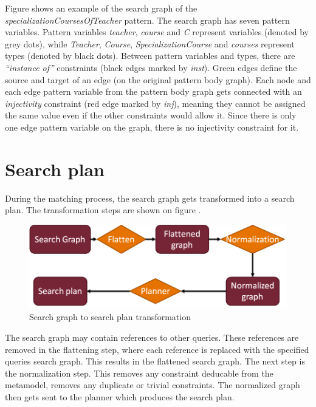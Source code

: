 Figure  shows an example of the search graph of the
\emph{specializationCoursesOfTeacher} pattern. The search graph has seven
pattern variables. Pattern variables \emph{teacher}, \emph{course} and \emph{C}
represent variables (denoted by grey dots), while \emph{Teacher},
\emph{Course}, \emph{SpecializationCourse} and \emph{courses} represent types
(denoted by black dots). Between pattern variables and types, there are
\emph{``instance of''} constraints (black edges marked by \emph{inst}). Green
edges define the source and target of an edge (on the original pattern body
graph). Each node and each edge pattern variable from the pattern body graph
gets connected with an \emph{injectivity} constraint (red edge marked by \emph{inj}), meaning they
cannot be assigned the same value even if the other constraints would allow it.
Since there is only one edge pattern variable on the graph, there is no
injectivity constraint for it.

\section{Search plan}\label{sec:SearchPlan}

During the matching process, the search graph gets transformed into a search
plan. The transformation steps are shown on figure .

\begin{figure}[!ht]
\centering
\includegraphics[width=130mm,
keepaspectratio]{figures/search_graph_plan_trans.png}
\caption{Search graph to search plan transformation}
\label{fig:graph_to_plan}
\end{figure}

The search graph may contain references to other queries. These references are
removed in the flattening step, where each reference is replaced with the
specified queries search graph. This results in the flattened search graph. The
next step is the normalization step. This removes any constraint deducable from
the metamodel, removes any duplicate or trivial constraints. The normalized
graph then gets sent to the planner which produces the search plan. 

